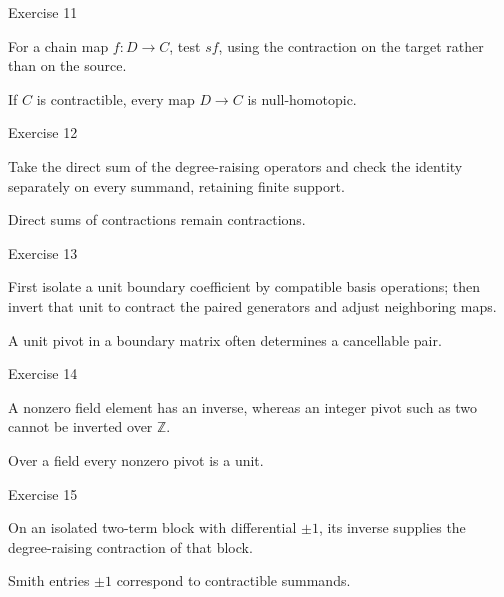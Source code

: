 \begin{exercise}\label{exr:viii23-11}
Exercise 11
\end{exercise}
\begin{hint}
For a chain map \(f:D\to C\), test \(sf\), using the contraction on the target rather than on the source.
\end{hint}
\begin{solution}
If \(C\) is contractible, every map \(D\to C\) is null-homotopic.
\end{solution}

\begin{exercise}\label{exr:viii23-12}
Exercise 12
\end{exercise}
\begin{hint}
Take the direct sum of the degree-raising operators and check the identity separately on every summand, retaining finite support.
\end{hint}
\begin{solution}
Direct sums of contractions remain contractions.
\end{solution}

\begin{exercise}\label{exr:viii23-13}
Exercise 13
\end{exercise}
\begin{hint}
First isolate a unit boundary coefficient by compatible basis operations; then invert that unit to contract the paired generators and adjust neighboring maps.
\end{hint}
\begin{solution}
A unit pivot in a boundary matrix often determines a cancellable pair.
\end{solution}

\begin{exercise}\label{exr:viii23-14}
Exercise 14
\end{exercise}
\begin{hint}
A nonzero field element has an inverse, whereas an integer pivot such as two cannot be inverted over \(\mathbb Z\).
\end{hint}
\begin{solution}
Over a field every nonzero pivot is a unit.
\end{solution}

\begin{exercise}\label{exr:viii23-15}
Exercise 15
\end{exercise}
\begin{hint}
On an isolated two-term block with differential \(\pm1\), its inverse supplies the degree-raising contraction of that block.
\end{hint}
\begin{solution}
Smith entries \(\pm1\) correspond to contractible summands.
\end{solution}

